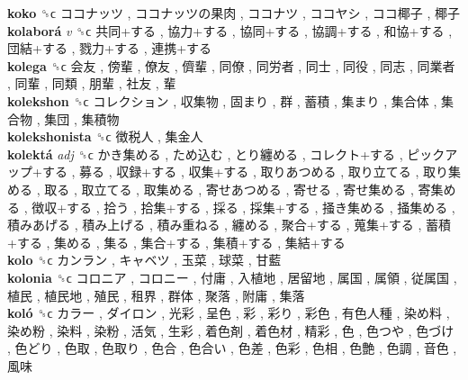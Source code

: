 \textbf{koko} ␝ϲ   ココナッツ ,  ココナッツの果肉 ,  ココナツ ,  ココヤシ ,  ココ椰子 ,  椰子   \\
\textbf{kolaborá} \emph{v}  ␝ϲ   共同+する ,  協力+する ,  協同+する ,  協調+する ,  和協+する ,  団結+する ,  戮力+する ,  連携+する   \\
\textbf{kolega} ␝ϲ   会友 ,  傍輩 ,  僚友 ,  儕輩 ,  同僚 ,  同労者 ,  同士 ,  同役 ,  同志 ,  同業者 ,  同輩 ,  同類 ,  朋輩 ,  社友 ,  輩   \\
\textbf{kolekshon} ␝ϲ   コレクション ,  収集物 ,  固まり ,  群 ,  蓄積 ,  集まり ,  集合体 ,  集合物 ,  集団 ,  集積物   \\
\textbf{kolekshonista} ␝ϲ   徴税人 ,  集金人   \\
\textbf{kolektá} \emph{adj}  ␝ϲ   かき集める ,  ため込む ,  とり纏める ,  コレクト+する ,  ピックアップ+する ,  募る ,  収録+する ,  収集+する ,  取りあつめる ,  取り立てる ,  取り集める ,  取る ,  取立てる ,  取集める ,  寄せあつめる ,  寄せる ,  寄せ集める ,  寄集める ,  徴収+する ,  拾う ,  拾集+する ,  採る ,  採集+する ,  掻き集める ,  掻集める ,  積みあげる ,  積み上げる ,  積み重ねる ,  纏める ,  聚合+する ,  蒐集+する ,  蓄積+する ,  集める ,  集る ,  集合+する ,  集積+する ,  集結+する   \\
\textbf{kolo} ␝ϲ   カンラン ,  キャベツ ,  玉菜 ,  球菜 ,  甘藍   \\
\textbf{kolonia} ␝ϲ   コロニア ,  コロニー ,  付庸 ,  入植地 ,  居留地 ,  属国 ,  属領 ,  従属国 ,  植民 ,  植民地 ,  殖民 ,  租界 ,  群体 ,  聚落 ,  附庸 ,  集落   \\
\textbf{koló} ␝ϲ   カラー ,  ダイロン ,  光彩 ,  呈色 ,  彩 ,  彩り ,  彩色 ,  有色人種 ,  染め料 ,  染め粉 ,  染料 ,  染粉 ,  活気 ,  生彩 ,  着色剤 ,  着色材 ,  精彩 ,  色 ,  色つや ,  色づけ ,  色どり ,  色取 ,  色取り ,  色合 ,  色合い ,  色差 ,  色彩 ,  色相 ,  色艶 ,  色調 ,  音色 ,  風味   \\
